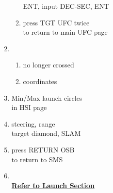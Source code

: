 \documentclass[fontInter, widesubsec]{TechCheck}
\begin{document}
\begin{enumerate}
\begin{enumerate}
			\hfill ENT, input DEC-SEC, ENT
			\item {}\dotfill press TGT UFC twice\\
			\hfill  to return to main UFC page
		\end{enumerate}
		\item {}
		\begin{enumerate}
			\item {}\dotfill no longer crossed
			\item {}\dotfill coordinates
		\end{enumerate}
		\item {}\dotfill Min/Max launch circles\\
		\hfill in HSI page
		\item {}\dotfill steering, range \\
		\hfill  target diamond, SLAM
		\item {}\dotfill press RETURN OSB \\
		\hfill to return to SMS
		\item {} \\
		\hfill \hyperref[subsec:84launch]{\textbf{Refer to Launch Section}}
	\end{enumerate}
\end{document}
